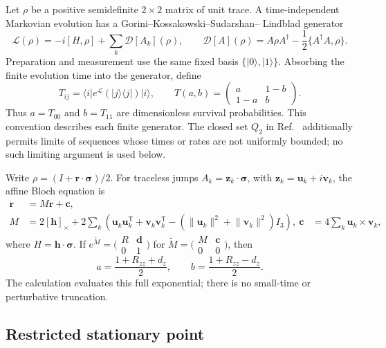 \documentclass[11pt,a4paper]{article}
\newcommand{\cL}{\mathcal{L}}
\newcommand{\cD}{\mathcal{D}}
\newcommand{\ket}[1]{\lvert #1\rangle}
\newcommand{\bra}[1]{\langle #1\rvert}
\newcommand{\dyad}[2]{\lvert #1\rangle\!\langle #2\rvert}
\begin{document}
Let $\rho$ be a positive semidefinite $2\times2$ matrix of unit trace.  A
time-independent Markovian evolution has a Gorini--Kossakowski--Sudarshan--
Lindblad generator~\cite{Gorini1976,Lindblad1976}
\begin{equation}
 \cL(\rho)=-i[H,\rho]+\sum_k \cD[A_k](\rho),\qquad
 \cD[A](\rho)=A\rho A^\dagger-\frac12\{A^\dagger A,\rho\}.
 \label{eq:gksl}
\end{equation}
Preparation and measurement use the same fixed basis
$\{\ket{0},\ket{1}\}$.  Absorbing the finite evolution time into the
generator, define
\begin{equation}
 T_{ij}=\bra{i}e^{\cL}(\dyad{j}{j})\ket{i},\qquad
 T(a,b)=\begin{pmatrix}a&1-b\\1-a&b\end{pmatrix}.
 \label{eq:observable}
\end{equation}
Thus $a=T_{00}$ and $b=T_{11}$ are dimensionless survival probabilities.
This convention describes each finite generator.  The closed set $Q_2$ in
Ref.~\cite{Shahbeigi2024} additionally permits limits of sequences whose
times or rates are not uniformly bounded; no such limiting argument is used
below.

Write $\rho=(I+\bm r\cdot\bm\sigma)/2$.  For traceless jumps
$A_k=\bm z_k\cdot\bm\sigma$, with
$\bm z_k=\bm u_k+i\bm v_k$, the affine Bloch equation is
\begin{align}
 \dot{\bm r}&=M\bm r+\bm c,\nonumber\\
 M&=2[\bm h]_{\times}
 +2\sum_k\left(\bm u_k\bm u_k^{\mathsf T}
 +\bm v_k\bm v_k^{\mathsf T}
 -(\lVert\bm u_k\rVert^2+\lVert\bm v_k\rVert^2)I_3\right),
 \label{eq:bloch}\
 \bm c&=4\sum_k\bm u_k\times\bm v_k,
\end{align}
where $H=\bm h\cdot\bm\sigma$.  If
$e^{\widetilde M}=\bigl(\begin{smallmatrix}R&\bm d\\0&1\end{smallmatrix}\bigr)$
for $\widetilde M=\bigl(\begin{smallmatrix}M&\bm c\\0&0\end{smallmatrix}\bigr)$,
then
\begin{equation}
 a=\frac{1+R_{zz}+d_z}{2},\qquad
 b=\frac{1+R_{zz}-d_z}{2}.
 \label{eq:ab-bloch}
\end{equation}
The calculation evaluates this full exponential; there is no small-time or
perturbative truncation.

\subsection{Restricted stationary point}
\end{document}
